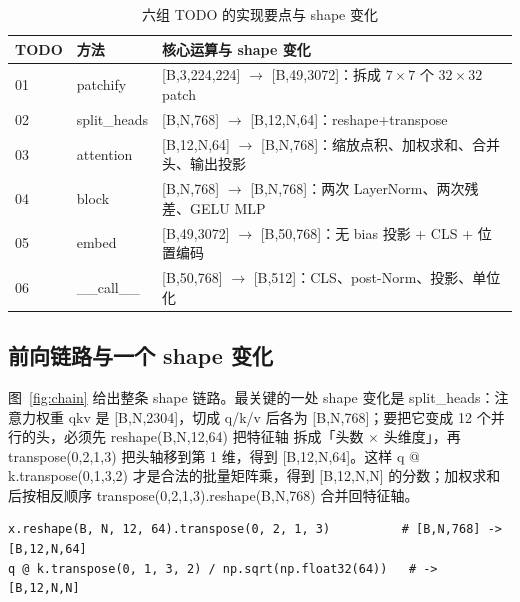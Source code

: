 \documentclass[a4paper,12pt]{article}
\newcommand{\code}[1]{{\ttfamily\footnotesize #1}}
\begin{document}
\begin{table}[H]
\centering
\footnotesize
\setlength{\tabcolsep}{3pt}
\caption{六组 TODO 的实现要点与 shape 变化}
\label{tab:todo}
\begin{tabular}{@{}l l p{9.2cm}@{}}
\toprule
\textbf{TODO} & \textbf{方法} & \textbf{核心运算与 shape 变化} \\
\midrule
01 & \code{patchify} & \code{[B,3,224,224]} $\to$ \code{[B,49,3072]}：拆成 $7\times7$ 个 $32\times32$ patch \\
02 & \code{split\_heads} & \code{[B,N,768]} $\to$ \code{[B,12,N,64]}：\code{reshape}+\code{transpose} \\
03 & attention & \code{[B,12,N,64]} $\to$ \code{[B,N,768]}：缩放点积、加权求和、合并头、输出投影 \\
04 & block & \code{[B,N,768]} $\to$ \code{[B,N,768]}：两次 LayerNorm、两次残差、GELU MLP \\
05 & \code{embed} & \code{[B,49,3072]} $\to$ \code{[B,50,768]}：无 bias 投影 + CLS + 位置编码 \\
06 & \code{\_\_call\_\_} & \code{[B,50,768]} $\to$ \code{[B,512]}：CLS、post-Norm、投影、单位化 \\
\bottomrule
\end{tabular}
\end{table}

\subsection{前向链路与一个 shape 变化}

图~\ref{fig:chain} 给出整条 shape 链路。最关键的一处 shape 变化是
\code{split\_heads}：注意力权重 \code{qkv} 是 \code{[B,N,2304]}，切成 q/k/v 后各为
\code{[B,N,768]}；要把它变成 12 个并行的头，必须先 \code{reshape(B,N,12,64)} 把特征轴
拆成「头数 $\times$ 头维度」，再 \code{transpose(0,2,1,3)} 把头轴移到第 1 维，得到
\code{[B,12,N,64]}。这样 \code{q @ k.transpose(0,1,3,2)} 才是合法的批量矩阵乘，得到
\code{[B,12,N,N]} 的分数；加权求和后按相反顺序 \code{transpose(0,2,1,3).reshape(B,N,768)}
合并回特征轴。

\begin{lstlisting}[caption={多头拆分与分数计算（\code{image\_encoder.py} 核心两行）}, label={lst:head}]
x.reshape(B, N, 12, 64).transpose(0, 2, 1, 3)          # [B,N,768] -> [B,12,N,64]
q @ k.transpose(0, 1, 3, 2) / np.sqrt(np.float32(64))   # -> [B,12,N,N]
\end{lstlisting}
\end{document}
